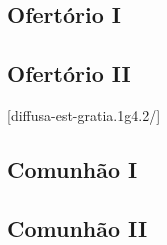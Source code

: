 \AllowPageFlush

\subsection{Ofertório I}\label{subsection:communia/commune-sanctarum/offertorium-1}

\AllowPageFlush

\subsection{Ofertório II}\label{subsection:communia/commune-sanctarum/offertorium-2}
[diffusa-est-gratia.1g4.2/]

\AllowPageFlush

\subsection{Comunhão I}\label{subsection:communia/commune-sanctarum/communio-1}

\AllowPageFlush

\subsection{Comunhão II}\label{subsection:communia/commune-sanctarum/communio-2}
